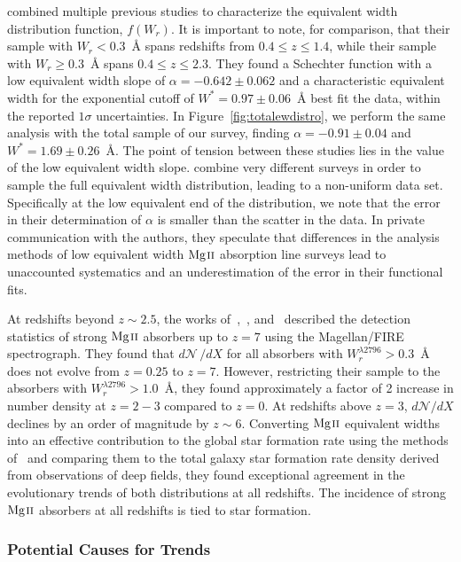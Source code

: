 \cite{Kacprzak2011MgII} combined multiple previous studies to characterize the equivalent width distribution function, $f(W_r)$. It is important to note, for comparison, that their sample with $W_r < 0.3$~{\AA} spans redshifts from $0.4 \le z \le 1.4$, while their sample with $W_r \ge 0.3$~{\AA} spans $0.4 \le z \le 2.3$. They found a Schechter function with a low equivalent width slope of $\alpha = -0.642 \pm 0.062$ and a characteristic equivalent width for the exponential cutoff of $W^* = 0.97 \pm 0.06$~{\AA} best fit the data, within the reported $1\sigma$ uncertainties. In Figure~\ref{fig:totalewdistro}, we perform the same analysis with the total sample of our survey, finding $\alpha = -0.91 \pm 0.04$ and $W^* = 1.69 \pm 0.26$~{\AA}. The point of tension between these studies lies in the value of the low equivalent width slope. \cite{Kacprzak2011MgII} combine very different surveys in order to sample the full equivalent width distribution, leading to a non-uniform data set. Specifically at the low equivalent end of the distribution, we note that the error in their determination of $\alpha$ is smaller than the scatter in the data. In private communication with the authors, they speculate that differences in the analysis methods of low equivalent width ${\hbox{{\rm Mg}\kern 0.1em{\sc ii}}}$ absorption line surveys lead to unaccounted systematics and an underestimation of the error in their functional fits.

At redshifts beyond $z \sim 2.5$, the works of~\cite{Matejek2012},~\cite{Matejek2013}, and~\cite{Chen2016} described the detection statistics of strong ${\hbox{{\rm Mg}\kern 0.1em{\sc ii}}}$ absorbers up to $z = 7$ using the Magellan/FIRE spectrograph. They found that $d\mathcal{N}\,/dX$ for all absorbers with $W_r^{\lambda2796} > 0.3$~{\AA} does not evolve from $z = 0.25$ to $z = 7$. However, restricting their sample to the absorbers with $W_r^{\lambda2796} > 1.0$~{\AA}, they found approximately a factor of 2 increase in number density at $z = 2-3$ compared to $z = 0$. At redshifts above $z = 3$, $d\mathcal{N}\!/dX$ declines by an order of magnitude by $z \sim 6$. Converting ${\hbox{{\rm Mg}\kern 0.1em{\sc ii}}}$ equivalent widths into an effective contribution to the global star formation rate using the methods of~\cite{Menard2011} and comparing them to the total galaxy star formation rate density derived from observations of deep fields, they found exceptional agreement in the evolutionary trends of both distributions at all redshifts. The incidence of strong ${\hbox{{\rm Mg}\kern 0.1em{\sc ii}}}$ absorbers at all redshifts is tied to star formation.

\subsubsection{Potential Causes for Trends}
\label{ch5:trendcauses}

